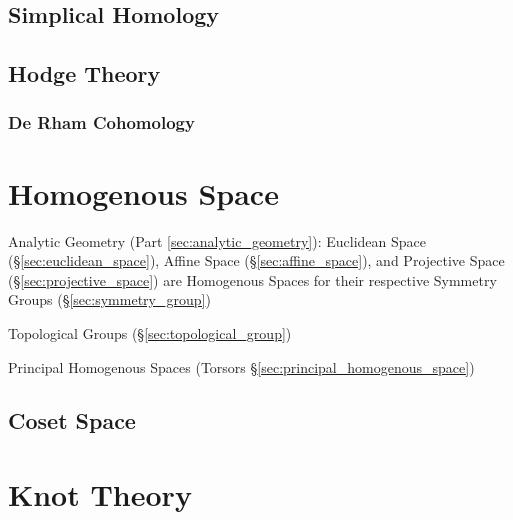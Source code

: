 \subsection{Simplical Homology}\label{sec:simplical_homology}

\subsection{Hodge Theory}\label{sec:hodge_theory}

\subsubsection{De Rham Cohomology}\label{sec:derham_cohomology}



\section{Homogenous Space}\label{sec:homogenous_space}

Analytic Geometry (Part \ref{sec:analytic_geometry}): Euclidean Space
(\S\ref{sec:euclidean_space}), Affine Space (\S\ref{sec:affine_space}), and
Projective Space (\S\ref{sec:projective_space}) are Homogenous Spaces for their
respective Symmetry Groups (\S\ref{sec:symmetry_group})

Topological Groups (\S\ref{sec:topological_group})

Principal Homogenous Spaces (Torsors \S\ref{sec:principal_homogenous_space})



\subsection{Coset Space}\label{sec:coset_space}



\section{Knot Theory} \label{sec:knot_theory}

